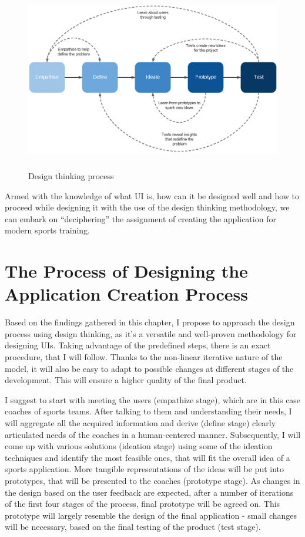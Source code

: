\begin{figure}[htb]
\begin{center}
  \includegraphics*[width=14cm,height=8cm,keepaspectratio]{images/design_thinking_5stag}
\end{center}
\caption{Design thinking process}
\label{img:design_thinking}
\end{figure}

Armed with the knowledge of what UI is, how can it be designed well and how to proceed while designing it with the use of the design thinking methodology, we can embark on “deciphering” the assignment of creating the application for modern sports training.

\section{The Process of Designing the Application Creation Process}
Based on the findings gathered in this chapter, I propose to approach the design process using design thinking, as it’s a versatile and well-proven methodology for designing UIs. Taking advantage of the predefined steps, there is an exact procedure, that I will follow. Thanks to the non-linear iterative nature of the model, it will also be easy to adapt to possible changes at different stages of the development. This will ensure a 
higher quality of the final product.

I suggest to start with meeting the users (empathize stage), which are in this case coaches of sports teams. After talking to them and understanding their needs, I will aggregate all the acquired information and derive (define stage) clearly articulated needs of the coaches in a human-centered manner. Subsequently, I will come up with various solutions (ideation stage) using some of the ideation techniques and identify the most feasible ones, that will fit the overall idea of a sports application. More tangible representations of the ideas will be put into prototypes, that will be presented to the coaches (prototype stage). As changes in the design based on the user feedback are expected, after a number of iterations of the first four stages of the process, final prototype will be agreed on. This prototype will largely resemble the design of the final application - small changes will be necessary, based on the final testing of the product (test stage).



